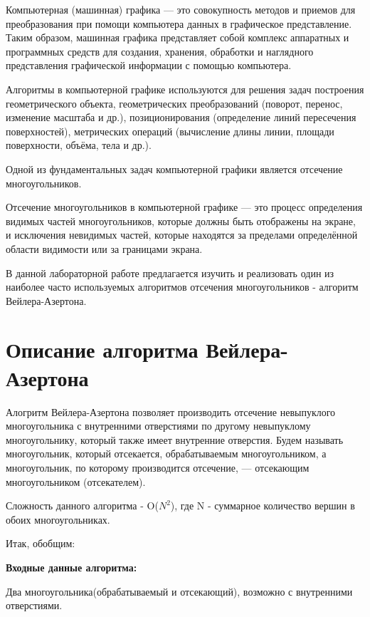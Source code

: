 \documentclass[12pt]{article}
\begin{document}
 Компьютерная (машинная) графика — это совокупность методов и приемов для преобразования при
помощи компьютера данных в графическое представление.
Таким образом, машинная графика представляет собой комплекс аппаратных и программных средств
для создания, хранения, обработки и наглядного представления графической информации с помощью
компьютера.

Алгоритмы в компьютерной графике используются для решения задач построения геометрического
объекта, геометрических преобразований (поворот, перенос, изменение масштаба и др.), позиционирования (определение линий пересечения поверхностей), метрических операций (вычисление длины линии,
площади поверхности, объёма, тела и др.).


 Одной из фундаментальных задач компьютерной графики является отсечение многоугольников.


Отсечение многоугольников в компьютерной графике — это процесс определения видимых частей многоугольников, которые должны быть отображены на экране, и исключения невидимых частей, которые находятся за пределами определённой области видимости или за границами экрана.

В данной лабораторной работе предлагается изучить и реализовать один из наиболее часто используемых алгоритмов отсечения многоугольников - алгоритм Вейлера-Азертона.



\newpage

\section{Описание алгоритма Вейлера-Азертона}

Алогритм Вейлера-Азертона позволяет производить отсечение невыпуклого многоугольника с внутренними
отверстиями по другому невыпуклому многоугольнику, который
также имеет внутренние отверстия. Будем называть многоугольник, который отсекается, обрабатываемым многоугольником, а
многоугольник, по которому производится отсечение, — отсекающим
многоугольником
(отсекателем).
 
Сложность данного алгоритма - O($ N^2 $), где N - суммарное количество вершин в обоих многоугольниках.





Итак, обобщим:

{ \bf Входные данные алгоритма:}

Два многоугольника(обрабатываемый и отсекающий), возможно с внутренними отверстиями.
\end{document}
